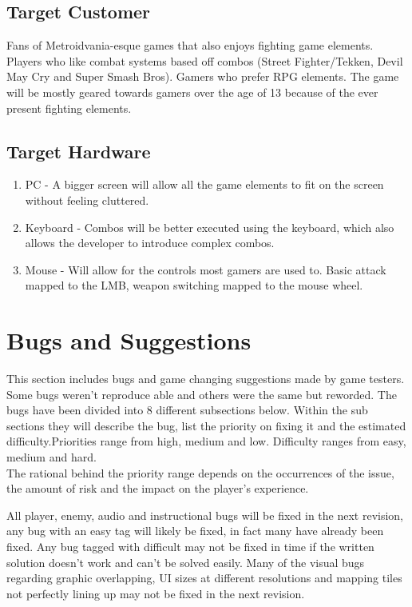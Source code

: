 \documentclass{article}
\begin{document}
\subsection*{Target Customer}
Fans of Metroidvania-esque games that also enjoys fighting game elements. Players who like combat systems based off combos (Street Fighter/Tekken, Devil May Cry and Super Smash Bros).
Gamers who prefer RPG elements. The game will be mostly geared towards gamers over the age of 13 because of the ever present fighting elements. 


\subsection*{Target Hardware}
    \begin{enumerate}
        \item PC - A bigger screen will allow all the game elements to fit on the screen without feeling cluttered. 
        \item Keyboard - Combos will be better executed using the keyboard, which also allows the developer to introduce complex combos.
        \item Mouse - Will allow for the controls most gamers are used to. Basic attack mapped to the LMB, weapon switching mapped to the mouse wheel.
    \end{enumerate}
    

\section*{Bugs and Suggestions}
This section includes bugs and game changing suggestions made by game testers. Some bugs weren't reproduce able and others were the same but reworded. The bugs have been divided into 8 different subsections below. Within the sub sections they will describe the bug, list the priority on fixing it and the estimated difficulty.Priorities range from high, medium and low. Difficulty ranges from easy, medium and hard.\\

The rational behind the priority range depends on the occurrences of the issue, the amount of risk and the impact on the player's experience. 

All player,  enemy, audio and instructional bugs will be fixed in the next revision, any bug with an easy tag will likely be fixed, in fact many have already been fixed. Any bug tagged with difficult may not be fixed in time if the written solution doesn't work  and can't be solved easily. Many of the visual bugs regarding  graphic overlapping, UI sizes at different resolutions and mapping tiles not perfectly lining up may not be fixed in the next revision.
\end{document}
